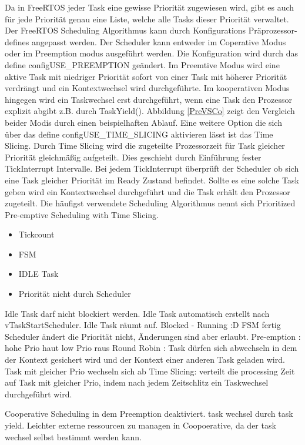 Da in FreeRTOS jeder Task eine gewisse Priorität zugewiesen wird, gibt es auch für jede Priorität genau eine Liste, welche alle Tasks dieser Priorität verwaltet. Der FreeRTOS Scheduling Algorithmus kann durch Konfigurations Präprozessor-defines angepasst werden. Der Scheduler kann entweder im Coperative Modus oder im Preemption modus ausgeführt werden. Die Konfiguration wird durch das define configUSE\_PREEMPTION geändert. Im Preemtive Modus wird eine aktive Task mit niedriger Priorität sofort von einer Task mit höherer Priorität verdrängt und ein Kontextwechsel wird durchgeführte. Im kooperativen Modus hingegen wird ein Taskwechsel erst durchgeführt, wenn eine Task den Prozessor explizit abgibt z.B. durch TaskYield(). Abbildung \ref{PreVSCo} zeigt den Vergleich beider Modis durch einen beispielhaften Ablauf. Eine weitere Option die sich über das define configUSE\_TIME\_SLICING aktivieren lässt ist das Time Slicing. Durch Time Slicing wird die zugeteilte Prozessorzeit für Task gleicher Priorität gleichmäßig aufgeteilt. Dies geschieht durch Einführung fester TickInterrupt Intervalle. Bei jedem TickInterrupt überprüft der Scheduler ob sich eine Task gleicher Priorität im Ready Zustand befindet. Sollte es eine solche Task geben wird ein Kontextwechsel durchgeführt und die Task erhält den Prozessor zugeteilt. Die häufigst verwendete Scheduling Algorithmus nennt sich Prioritized Pre-emptive Scheduling with Time Slicing.


\begin{itemize}
	\item Tickcount
	\item FSM
	\item IDLE Task
	\item Priorität nicht durch Scheduler
\end{itemize}
                   
 

Idle Task darf nicht blockiert werden. Idle Task automatisch erstellt nach vTaskStartScheduler. Idle Task räumt auf.  
Blocked - Running :D FSM fertig
Scheduler ändert die Priorität nicht, Änderungen sind aber erlaubt.
Pre-emption : hohe Prio haut low Prio raus
Round Robin : Task dürfen sich abwechseln in dem der Kontext gesichert wird und der Kontext einer anderen Task geladen wird.
Task mit gleicher Prio wechseln sich ab
Time Slicing: verteilt die processing Zeit auf Task mit gleicher Prio, indem nach jedem Zeitschlitz ein Taskwechsel durchgeführt wird.

Cooperative Scheduling in dem Preemption deaktiviert. task wechsel durch task yield.
Leichter externe ressourcen zu managen in Coopoerative, da der task wechsel selbst bestimmt werden kann. 

